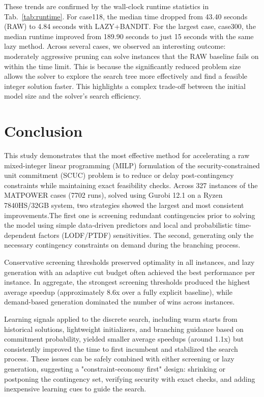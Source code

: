\documentclass{ieeeaccess}
\begin{document}
These trends are confirmed by the wall-clock runtime statistics in Tab.~\ref{tab:runtime}. For case118, the median time dropped from 43.40 seconds (RAW) to 4.84 seconds with LAZY+BANDIT. For the largest case, case300, the median runtime improved from 189.90 seconds to just 15 seconds with the same lazy method. Across several cases, we observed an interesting outcome: moderately aggressive pruning can solve instances that the RAW baseline fails on within the time limit. This is because the significantly reduced problem size allows the solver to explore the search tree more effectively and find a feasible integer solution faster. This highlights a complex trade-off between the initial model size and the solver's search efficiency.


\section{Conclusion}

This study demonstrates that the most effective method for accelerating a raw mixed-integer linear programming (MILP) formulation of the security-constrained unit commitment (SCUC) problem is to reduce or delay post-contingency constraints while maintaining exact feasibility checks. Across 327 instances of the MATPOWER cases (7702 runs), solved using Gurobi 12.1 on a Ryzen 7840HS/32GB system, two strategies showed the largest and most consistent improvements.The first one is screening redundant contingencies prior to solving the model using simple data-driven predictors and local and probabilistic time-dependent factors (LODF/PTDF) sensitivities. The second, generating only the necessary contingency constraints on demand during the branching process.

Conservative screening thresholds preserved optimality in all instances, and lazy generation with an adaptive cut budget often achieved the best performance per instance. In aggregate, the strongest screening thresholds produced the highest average speedup (approximately 8.6x over a fully explicit baseline), while demand-based generation dominated the number of wins across instances.

Learning signals applied to the discrete search, including warm starts from historical solutions, lightweight initializers, and branching guidance based on commitment probability, yielded smaller average speedups (around 1.1x) but consistently improved the time to first incumbent and stabilized the search process. These issues can be safely combined with either screening or lazy generation, suggesting a "constraint-economy first" design: shrinking or postponing the contingency set, verifying security with exact checks, and adding inexpensive learning cues to guide the search.
\end{document}
